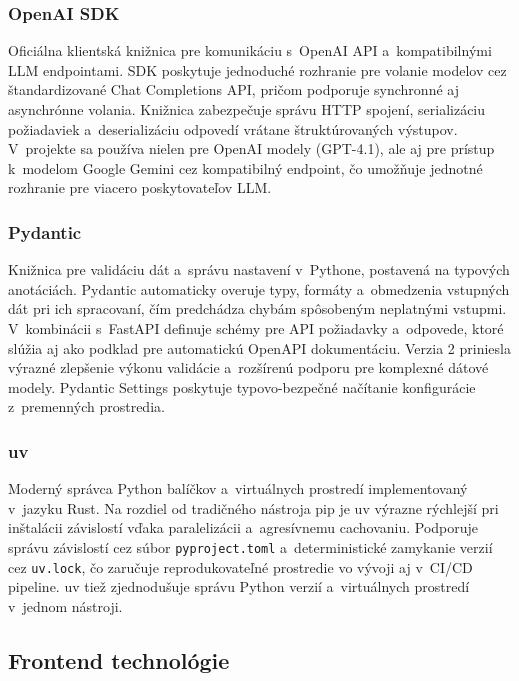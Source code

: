 \documentclass[a4paper, 12pt]{article}
\begin{document}
\subsubsection*{OpenAI SDK}

Oficiálna klientská knižnica pre komunikáciu s~OpenAI API a~kompatibilnými LLM endpointami. SDK poskytuje jednoduché rozhranie pre volanie modelov cez štandardizované Chat Completions API, pričom podporuje synchronné aj asynchrónne volania. Knižnica zabezpečuje správu HTTP spojení, serializáciu požiadaviek a~deserializáciu odpovedí vrátane štruktúrovaných výstupov. V~projekte sa používa nielen pre OpenAI modely (GPT-4.1), ale aj pre prístup k~modelom Google Gemini cez kompatibilný endpoint, čo umožňuje jednotné rozhranie pre viacero poskytovateľov LLM.

\subsubsection*{Pydantic}

Knižnica pre validáciu dát a~správu nastavení v~Pythone, postavená na typových anotáciách. Pydantic automaticky overuje typy, formáty a~obmedzenia vstupných dát pri ich spracovaní, čím predchádza chybám spôsobeným neplatnými vstupmi. V~kombinácii s~FastAPI definuje schémy pre API požiadavky a~odpovede, ktoré slúžia aj ako podklad pre automatickú OpenAPI dokumentáciu. Verzia 2 priniesla výrazné zlepšenie výkonu validácie a~rozšírenú podporu pre komplexné dátové modely. Pydantic Settings poskytuje typovo-bezpečné načítanie konfigurácie z~premenných prostredia.

\subsubsection*{uv}

Moderný správca Python balíčkov a~virtuálnych prostredí implementovaný v~jazyku Rust. Na rozdiel od tradičného nástroja pip je uv výrazne rýchlejší pri inštalácii závislostí vďaka paralelizácii a~agresívnemu cachovaniu. Podporuje správu závislostí cez súbor \texttt{pyproject.toml} a~deterministické zamykanie verzií cez \texttt{uv.lock}, čo zaručuje reprodukovateľné prostredie vo vývoji aj v~CI/CD pipeline. uv tiež zjednodušuje správu Python verzií a~virtuálnych prostredí v~jednom nástroji.


\subsection{Frontend technológie}
\end{document}
